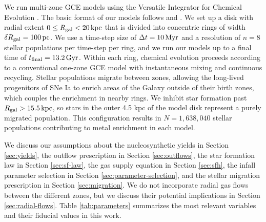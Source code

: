 \documentclass[twocolumn,twocolappendix,linenumbers]{aastex631}
\newcommand{\kpc}{\,{\rm kpc}}
\begin{document}
We run multi-zone GCE models using the Versatile Integrator for Chemical Evolution \citep[{\tt VICE};][]{johnson_impact_2020}. The basic format of our models follows \citet{johnson_stellar_2021} and \citet{dubay_galactic_2024}. We set up a disk with radial extent $0\leq R_{\rm gal}<20\kpc$ that is divided into concentric rings of width $\delta R_{\rm gal}=100\,{\rm pc}$. We use a time-step size of $\Delta t=10\,{\rm Myr}$ and a resolution of $n=8$ stellar populations per time-step per ring, and we run our models up to a final time of $t_{\rm final}=13.2\,{\rm Gyr}$. Within each ring, chemical evolution proceeds according to a conventional one-zone GCE model with instantaneous mixing and continuous recycling. Stellar populations migrate between zones, allowing the long-lived progenitors of SNe Ia to enrich areas of the Galaxy outside of their birth zones, which couples the enrichment in nearby rings. We inhibit star formation past $R_{\rm gal}>15.5\kpc$, so stars in the outer 4.5 kpc of the model disk represent a purely migrated population. This configuration results in $N=1,638,040$ stellar populations contributing to metal enrichment in each model.

We discuss our assumptions about the nucleosynthetic yields in Section \ref{sec:yields}, the outflow prescription in Section \ref{sec:outflows}, the star formation law in Section \ref{sec:sf-law}, the gas supply equation in Section \ref{sec:sfh}, the infall parameter selection in Section \ref{sec:parameter-selection}, and the stellar migration prescription in Section \ref{sec:migration}. We do not incorporate radial gas flows between the different zones, but we discuss their potential implications in Section \ref{sec:radial-flows}. Table \ref{tab:parameters} summarizes the most relevant variables and their fiducial values in this work.
\end{document}
